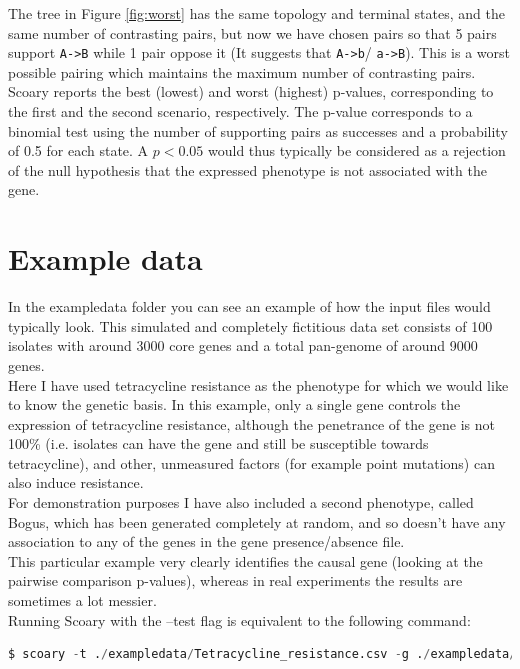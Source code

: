 \documentclass{article}
\begin{document}
    The tree in Figure \ref{fig:worst} has the same topology and terminal states, and the same number of contrasting pairs, but now we have chosen pairs so that 5 pairs support \verb+A->B+ while 1 pair oppose it (It suggests that \verb+A->b+/ \verb+a->B+). This is a worst possible pairing which maintains the maximum number of contrasting pairs. \\

    Scoary reports the best (lowest) and worst (highest) p-values, corresponding to the first and the second scenario, respectively. The p-value corresponds to a binomial test using the number of supporting pairs as successes and a probability of 0.5 for each state. A $p<0.05$ would thus typically be considered as a rejection of the null hypothesis that the expressed phenotype is not associated with the gene. \\

  \section{Example data}
    In the exampledata folder you can see an example of how the input files would typically look. This simulated and completely fictitious data set consists of 100 isolates with around 3000 core genes and a total pan-genome of around 9000 genes. \\ 

    Here I have used tetracycline resistance as the phenotype for which we would like to know the genetic basis. In this example, only a single gene controls the expression of tetracycline resistance, although the penetrance of the gene is not 100\% (i.e. isolates can have the gene and still be susceptible towards tetracycline), and other, unmeasured factors (for example point mutations) can also induce resistance. \\

    For demonstration purposes I have also included a second phenotype, called Bogus, which has been generated completely at random, and so doesn't have any association to any of the genes in the gene presence/absence file. \\

    This particular example very clearly identifies the causal gene (looking at the pairwise comparison p-values), whereas in real experiments the results are sometimes a lot messier. \\

    Running Scoary with the --test flag is equivalent to the following command: \\
    \begin{lstlisting}[language=python, basicstyle=\small]
      $ scoary -t ./exampledata/Tetracycline_resistance.csv -g ./exampledata/Gene_presence_absence.csv -u -c I EPW
    \end{lstlisting}
\end{document}
